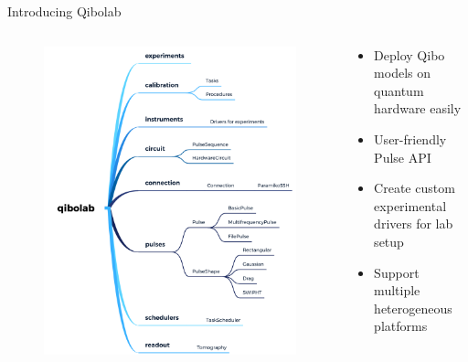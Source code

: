 \documentclass[11p,aspectratio=169]{beamer}
\begin{document}
\begin{frame}{Introducing Qibolab}
    \begin{columns}
        \begin{column}[]{0.5 \textwidth}
            \begin{figure}
                \includegraphics[height=0.8\textheight]{figures/qibolab.png}
            \end{figure}
            
        \end{column}

        \begin{column}[]{0.5 \textwidth}
            \begin{tcolorbox}[colframe=gray,title=Qibolab features:]
                \begin{itemize}
                    \item Deploy Qibo models on quantum hardware easily
                    \item User-friendly Pulse API
                    \item Create custom experimental drivers for lab setup
                    \item Support multiple heterogeneous platforms
                \end{itemize}
                \end{tcolorbox}
        \end{column}
    \end{columns}
\end{frame}
\end{document}
